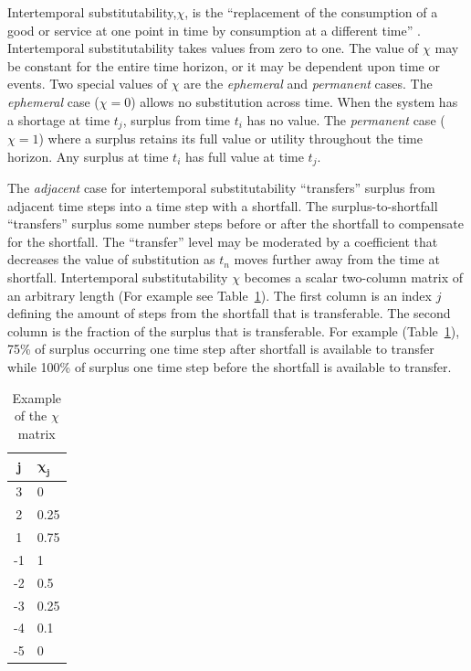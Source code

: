 \documentclass[preprint,12pt]{elsarticle}
\begin{document}
Intertemporal substitutability,$\chi$, is the ``replacement of the consumption
of a good or service at one point in time by consumption at a
different time'' \cite{Black2013}. Intertemporal substitutability takes 
values from zero to one. The value of $\chi$ may be constant for the
entire time horizon, or it may be dependent upon time or events. Two
special values of $\chi$ are the \emph{ephemeral} and \emph{permanent}
cases. The \emph{ephemeral} case ($\chi = 0$) allows no substitution across
time. When the system has a shortage at time $t_j$, surplus from time
$t_i$ has no value. The  \emph{permanent} case ($\chi = 1$) where a
surplus retains its full value or utility throughout the time
horizon. Any surplus at time $t_i$ has full value at time $t_j$.



The \emph{adjacent}
case for intertemporal substitutability ``transfers'' surplus from adjacent
time steps into a time step with a shortfall. The surplus-to-shortfall
``transfers'' surplus some number steps before or after 
the shortfall to compensate for the shortfall. The ``transfer'' level may be moderated by a
coefficient that decreases the value of substitution as $t_n$ moves
further away from the time at shortfall.  Intertemporal
substitutability $\chi$ becomes a scalar two-column matrix of an
arbitrary length (For example see Table~\ref{t:chiVec}). The first
column is an index $j$ defining the amount 
of steps from the shortfall that is transferable. The second column is
the fraction of the surplus that is transferable. For example (Table~\ref{t:chiVec}),
 75\% of surplus occurring one time step after shortfall is available
 to transfer while 100\% of surplus one time step before the shortfall
 is available to transfer.


\begin{table}[h]
  \centering
  \begin{tabular}{c l }
    \hline
    \hline
    \textbf{j} & $\mathbf{\chi_j}$ \\
    \hline
    3 & 0 \\
    2 & 0.25 \\
    1 & 0.75 \\
    -1 & 1 \\
    -2 & 0.5 \\
    -3 & 0.25 \\
    -4 & 0.1 \\
    -5 & 0 \\
    \hline
  \end{tabular}
  \caption{Example of the $\chi$ matrix}
  \label{t:chiVec}
\end{table}
\end{document}

